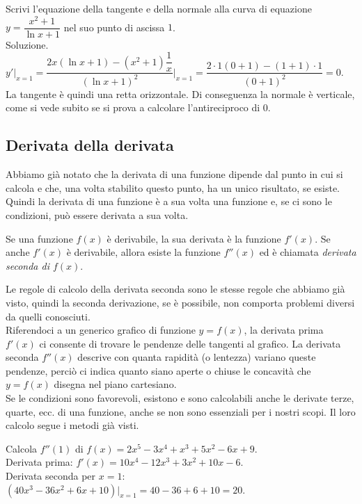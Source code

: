 \begin{esempio}
Scrivi l'equazione della tangente e della normale alla curva di equazione
$y=\dfrac{x^2+1}{\ln x +1}$ nel suo punto di ascissa $1$.\\
Soluzione. $y'|_{x=1}=\dfrac{2x(\ln x+1)-(x^2+1)\dfrac{1}{x}}
{(\ln x +1)^2}\bigg|_{x=1}=\dfrac{2\cdot 1(0+1)-(1+1)\cdot 1}{(0+1)^2}=0$.\\
La tangente è quindi una retta orizzontale. Di conseguenza la normale è 
verticale, come si vede subito se si prova a calcolare l'antireciproco di 
$0$.
\end{esempio}


\subsection{Derivata della derivata}
\label{}
Abbiamo già notato che la derivata  di una funzione dipende dal punto in 
cui si 
calcola e che, una volta stabilito questo punto, ha un unico risultato,
se esiste.
Quindi la derivata di una funzione è a sua volta una funzione e,
se ci sono le condizioni, può essere derivata a sua volta.
\begin{definizione}
 Se una funzione $f(x)$ è derivabile, la sua derivata è la funzione $f'(x)$.
 Se anche $f'(x)$ è derivabile, allora esiste la funzione $f''(x)$ ed è
 chiamata \emph{derivata seconda di $f(x)$}.
\end{definizione}
Le regole di calcolo della derivata seconda sono le stesse regole che 
abbiamo già visto, quindi la seconda derivazione, se è possibile, non comporta 
problemi diversi da quelli conosciuti.\\
Riferendoci a un generico grafico di funzione $y=f(x)$, la derivata prima 
$f'(x)$ ci consente di trovare le pendenze delle tangenti al grafico. La
derivata seconda $f''(x)$ descrive con quanta rapidità (o lentezza) variano 
queste pendenze, perciò ci indica quanto siano aperte o chiuse le concavità 
che $y=f(x)$ disegna nel piano cartesiano.\\
Se le condizioni sono favorevoli, esistono e sono calcolabili anche le 
derivate terze, quarte, ecc. di una funzione, anche se non sono essenziali 
per i nostri scopi. Il loro calcolo segue i metodi già visti.

\begin{esempio}
Calcola $f''(1)$ di $f(x)=2x^5-3x^4+x^3+5x^2-6x+9$.\\
Derivata prima: $f'(x)=10 x^4-12 x^3+3x^2+10 x-6$.\\
Derivata seconda per $x=1$: $(40x^3-36x^2+6x+10)|_{x=1}=40-36+6+10=20$.
\end{esempio}

